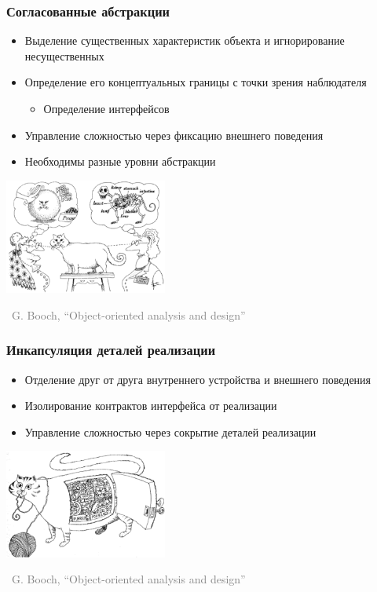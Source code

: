 \documentclass[xetex,mathserif,serif]{beamer}
\newcommand{\attribution}[1] {
\vspace{-5mm}\begin{flushright}\begin{scriptsize}\textcolor{gray}{\textcopyright\, #1}\end{scriptsize}\end{flushright}
}
\begin{document}
	\begin{frame}
		\frametitle{Согласованные абстракции}
		\begin{itemize}
			\item Выделение существенных характеристик объекта и игнорирование несущественных
			\item Определение его концептуальных границы с точки зрения наблюдателя
			\begin{itemize}
				\item Определение интерфейсов
			\end{itemize}
			\item Управление сложностью через фиксацию внешнего поведения
			\item Необходимы разные уровни абстракции
		\end{itemize}
		\begin{center}
			\includegraphics[width=0.4\textwidth]{abstraction.png}
			\attribution{G. Booch, ``Object-oriented analysis and design''}
		\end{center}
	\end{frame}

	\begin{frame}
		\frametitle{Инкапсуляция деталей реализации}
		\begin{itemize}
			\item Отделение друг от друга внутреннего устройства и внешнего поведения
			\item Изолирование контрактов интерфейса от реализации
			\item Управление сложностью через сокрытие деталей реализации
		\end{itemize}
		\vskip 1.5cm
		\begin{center}
			\includegraphics[width=0.4\textwidth]{incapsulation.png}
			\attribution{G. Booch, ``Object-oriented analysis and design''}
		\end{center}
	\end{frame}
\end{document}
